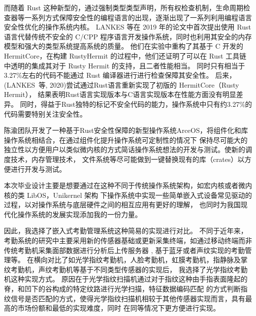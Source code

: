     而随着 Rust 这种新型的，通过强制类型类型声明，所有权检查机制，生命周期检查器等一系列方式保障安全性的编程语言的出现，逐渐出现了一系列利用编程语言安全性优化的操作系统内核。
    LANKES 等在 2019 年的论文中首次提出使用 Rust 语言代替传统不安全的 C/CPP 程序语言开发操作系统，同时也利用其安全的内存模型和强大的类型系统提高系统的质量。
    他们在实验中重构了其基于 C 开发的 HermitCore，在构建 RustyHermit 的过程中，他们还证明了可以在 Rust 工具链中透明的集成其对于 Rusty Hermit 的支持，且二者性能相当。
    同时只有相当于 3.27\%左右的代码不能通过 Rust 编译器进行进行检查保障其安全性。
    \cite{lankes_exploring_2019, lankes_rustyhermit_2020}
    后来，(LANKES 等, 2020)尝试通过Rust语言重新实现了初版的 HermitCore（Rusty Hermit），
    结果表明Rust语言实现版本与C语言实现版本在性能方面没有明显差异。
    同时，得益于Rust独特的标记不安全代码的能力，操作系统中只有约3.27\%的代码需要特别关注安全性。


    陈渝团队开发了一种基于Rust安全性保障的新型操作系统ArceOS，将组件化和库操作系统相结合，在通过组件化提升操作系统可定制性的情况下
    保持尽可能大的独立性以方便用户以类似微内核的方式简话操作系统想法的开发与测试。使新的调度技术，内存管理技术，
    文件系统等尽可能做到一键替换现有的库（crates）以方便进行开发与测试。

    本次毕业设计主要是想要通过在这种不同于传统操作系统架构，如宏内核或者微内核的类 LibOS，Unikernel 架构
    下操作系统中实现一些简单嵌入式设备常见驱动的过程，以对操作系统与底层硬件之间的相互应用有更好的理解，
    也同时为我国现代化操作系统的发展实现添加我的一份力量。

    因此，我选择了嵌入式考勤管理系统这种简易的实现进行对比。
    不同于近年来，考勤系统的研究中主要采用新的传感器基础或更新采集终端，如通过移动终端而非传统考勤机采集面部数据进行分析后上传服务器
    \cite{一种基于体征数据的考勤管理系统},
    基于蓝牙或者声纹实现的考勤管理等。
    \cite{一种基于体征数据的考勤管理系统, 李龙杰_2024_基于树莓派和声纹识别算法的课堂考勤系统, 一种基于蓝牙的无感考勤方法及系统}
    在横向对比了如光学指纹考勤机，人脸考勤机，虹膜考勤机，指静脉及掌纹考勤机，声纹考勤机等基于不同类型传感器的实现后，
    \cite{兰昊_2016_考勤系统现状综述}我选择了光学指纹考勤机这种实现方式。
    原因在于光学指纹扫描机通过对于指纹这种由手指表面隆起的脊，和凹下的谷构成的特定纹路进行光学扫描，特征数据编码匹配
    的方式判断指纹信号是否匹配的方式，使得光学指纹扫描机相较于其他传感器实现而言，具有最高的市场份额和最低的实现难度，同时
    在同等情况下更方便进行实现。
    \cite{李兴春_2007_指纹考勤系统研究}

